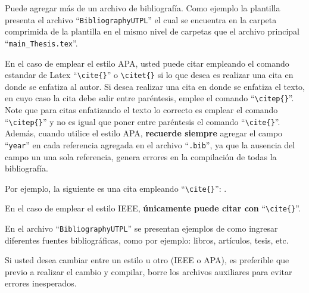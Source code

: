 Puede agregar más de un archivo de bibliografía. Como ejemplo la plantilla presenta el archivo ``\lstinline|BibliographyUTPL|'' el cual se encuentra en la carpeta comprimida de la plantilla en el mismo nivel de carpetas que el archivo principal ``\lstinline|main_Thesis.tex|''. 
 
En el caso de emplear el estilo APA, usted puede citar empleando el comando estandar de Latex ``\lstinline|\cite{}|'' o \lstinline|\citet{}| si lo que desea es realizar una cita en donde se enfatiza al autor. Si desea realizar una cita en donde se enfatiza el texto, en cuyo caso la cita debe salir entre paréntesis, emplee el comando ``\lstinline|\citep{}|''. Note que para citas enfatizando el texto lo correcto es emplear el comando ``\lstinline|\citep{}|'' y no es igual que poner entre paréntesis el comando ``\lstinline|\cite{}|''. Además, cuando utilice el estilo APA, \textbf{recuerde siempre} agregar el campo ``\lstinline|year|'' en cada referencia agregada en el archivo ``\lstinline|.bib|'', ya que la ausencia del campo un una sola referencia, genera errores en la compilación de todas la bibliografía. 

Por ejemplo, la siguiente es una cita empleando ``\lstinline|\cite{}|'': \cite{sandoval2017hybrid}. 

En el caso de emplear el estilo IEEE, \textbf{únicamente puede citar con} ``\lstinline|\cite{}|''. 

En el archivo ``\lstinline|BibliographyUTPL|'' se presentan ejemplos de como ingresar diferentes fuentes bibliográficas, como por ejemplo: libros, artículos, tesis, etc. 

Si usted desea cambiar entre un estilo u otro (IEEE o APA), es preferible que previo a realizar el cambio y compilar, borre los archivos auxiliares para evitar errores inesperados. 
